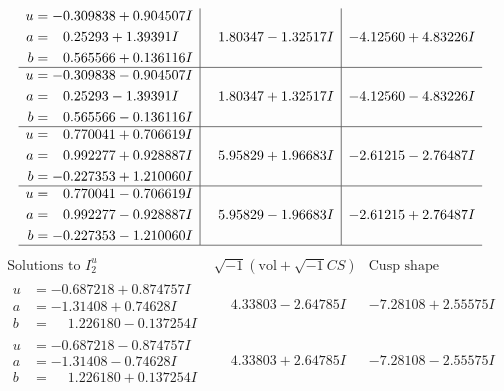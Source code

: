 \documentclass[1p]{elsarticle_modified}
\theoremstyle{definition}
\newcommand{\I}{\sqrt{-1}}
\begin{document}
$$\begin{array}{c|c|c}
\begin{aligned}
u &= -0.309838 + 0.904507 I \\
a &= \phantom{-}0.25293 + 1.39391 I \\
b &= \phantom{-}0.565566 + 0.136116 I\end{aligned}
 & \phantom{-}1.80347 - 1.32517 I & -4.12560 + 4.83226 I \\ \hline\begin{aligned}
u &= -0.309838 - 0.904507 I \\
a &= \phantom{-}0.25293 - 1.39391 I \\
b &= \phantom{-}0.565566 - 0.136116 I\end{aligned}
 & \phantom{-}1.80347 + 1.32517 I & -4.12560 - 4.83226 I \\ \hline\begin{aligned}
u &= \phantom{-}0.770041 + 0.706619 I \\
a &= \phantom{-}0.992277 + 0.928887 I \\
b &= -0.227353 + 1.210060 I\end{aligned}
 & \phantom{-}5.95829 + 1.96683 I & -2.61215 - 2.76487 I \\ \hline\begin{aligned}
u &= \phantom{-}0.770041 - 0.706619 I \\
a &= \phantom{-}0.992277 - 0.928887 I \\
b &= -0.227353 - 1.210060 I\end{aligned}
 & \phantom{-}5.95829 - 1.96683 I & -2.61215 + 2.76487 I\\
 \hline 
 \end{array}$$\newpage$$\begin{array}{c|c|c}  
\text{Solutions to }I^u_{2}& \I (\text{vol} + \sqrt{-1}CS) & \text{Cusp shape}\\
 \hline 
\begin{aligned}
u &= -0.687218 + 0.874757 I \\
a &= -1.31408 + 0.74628 I \\
b &= \phantom{-}1.226180 - 0.137254 I\end{aligned}
 & \phantom{-}4.33803 - 2.64785 I & -7.28108 + 2.55575 I \\ \hline\begin{aligned}
u &= -0.687218 - 0.874757 I \\
a &= -1.31408 - 0.74628 I \\
b &= \phantom{-}1.226180 + 0.137254 I\end{aligned}
 & \phantom{-}4.33803 + 2.64785 I & -7.28108 - 2.55575 I \\ \hline\begin{aligned}

\end{aligned}
\end{array}$$
\end{document}
